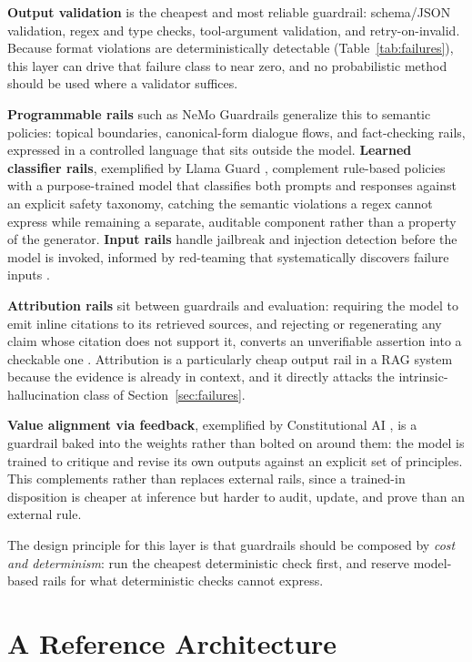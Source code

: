 \documentclass[11pt]{article}
\begin{document}
\textbf{Output validation} is the cheapest and most reliable guardrail:
schema/JSON validation, regex and type checks, tool-argument validation, and
retry-on-invalid. Because format violations are deterministically detectable
(Table~\ref{tab:failures}), this layer can drive that failure class to near
zero, and no probabilistic method should be used where a validator suffices.

\textbf{Programmable rails} such as NeMo Guardrails \citep{rebedea2023nemo}
generalize this to semantic policies: topical boundaries, canonical-form
dialogue flows, and fact-checking rails, expressed in a controlled language that
sits outside the model. \textbf{Learned classifier rails}, exemplified by Llama
Guard \citep{inan2023llamaguard}, complement rule-based policies with a
purpose-trained model that classifies both prompts and responses against an
explicit safety taxonomy, catching the semantic violations a regex cannot express
while remaining a separate, auditable component rather than a property of the
generator. \textbf{Input rails} handle jailbreak and injection detection before
the model is invoked, informed by red-teaming that systematically discovers
failure inputs \citep{perez2022redteaming,ganguli2022redteaming}.

\textbf{Attribution rails} sit between guardrails and evaluation: requiring the
model to emit inline citations to its retrieved sources, and rejecting or
regenerating any claim whose citation does not support it, converts an unverifiable
assertion into a checkable one \citep{gao2023citations}. Attribution is a
particularly cheap output rail in a RAG system because the evidence is already in
context, and it directly attacks the intrinsic-hallucination class of
Section~\ref{sec:failures}.

\textbf{Value alignment via feedback}, exemplified by Constitutional AI
\citep{bai2022constitutional}, is a guardrail baked into the weights rather than
bolted on around them: the model is trained to critique and revise its own
outputs against an explicit set of principles. This complements rather than
replaces external rails, since a trained-in disposition is cheaper at inference
but harder to audit, update, and prove than an external rule.

The design principle for this layer is that guardrails should be composed by
\emph{cost and determinism}: run the cheapest deterministic check first, and
reserve model-based rails for what deterministic checks cannot express.

\section{A Reference Architecture}
\label{sec:arch}
\end{document}
